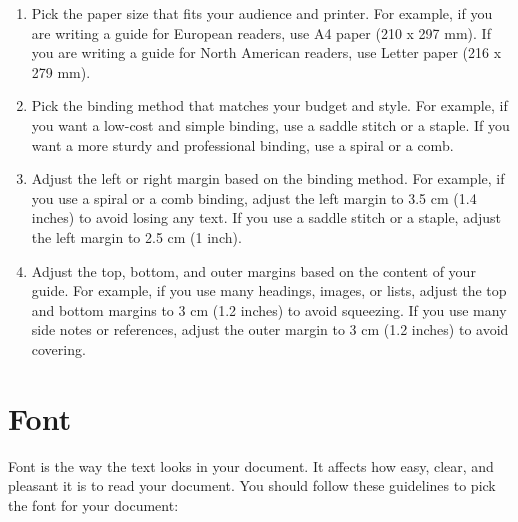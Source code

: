 \documentclass[12pt]{article}
\begin{document}
\begin{enumerate}
    \item Pick the paper size that fits your audience and printer. For example, if you are writing a guide for European readers, use A4 paper (210 x 297 mm). If you are writing a guide for North American readers, use Letter paper (216 x 279 mm).
    \item Pick the binding method that matches your budget and style. For example, if you want a low-cost and simple binding, use a saddle stitch or a staple. If you want a more sturdy and professional binding, use a spiral or a comb.
    \item Adjust the left or right margin based on the binding method. For example, if you use a spiral or a comb binding, adjust the left margin to 3.5 cm (1.4 inches) to avoid losing any text. If you use a saddle stitch or a staple, adjust the left margin to 2.5 cm (1 inch).
    \item Adjust the top, bottom, and outer margins based on the content of your guide. For example, if you use many headings, images, or lists, adjust the top and bottom margins to 3 cm (1.2 inches) to avoid squeezing. If you use many side notes or references, adjust the outer margin to 3 cm (1.2 inches) to avoid covering.
\end{enumerate}

\pagebreak

\section{Font}

Font is the way the text looks in your document. It affects how easy, clear, and pleasant it is to read your document. You should follow these guidelines to pick the font for your document:
\end{document}
